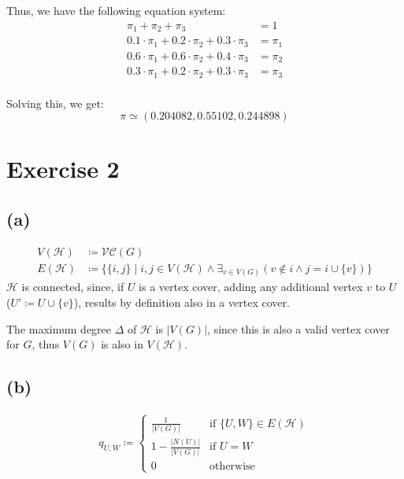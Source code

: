 \documentclass[12pt]{article}
\begin{document}
Thus, we have the following equation system:
\begin{align*}
	\pi_1 + \pi_2 + \pi_3 &= 1 \\
	0.1 \cdot \pi_1 + 0.2 \cdot \pi_2 + 0.3 \cdot \pi_3 &= \pi_1 \\
	0.6 \cdot \pi_1 + 0.6 \cdot \pi_2 + 0.4 \cdot \pi_3 &= \pi_2 \\
	0.3 \cdot \pi_1 + 0.2 \cdot \pi_2 + 0.3 \cdot \pi_3 &= \pi_3 \\
\end{align*}

Solving this, we get:
\begin{equation*}
	\pi \simeq \left(0.204082, 0.55102, 0.244898 \right)
\end{equation*}

\section*{Exercise 2}
\subsection*{(a)}
\begin{align*}
	V(\mathcal{H}) &\coloneqq \mathcal{VC}(G) \\
	E(\mathcal{H}) &\coloneqq \{\{i,j\} \mid i,j \in V(\mathcal{H}) \land \exists_{v \in V(G)} (v \not\in i \land j = i \cup \{v\})\}
\end{align*}
$\mathcal{H}$ is connected, since, if $U$ is a vertex cover, adding any additional vertex $v$ to $U$ ($U' \coloneqq U \cup \{v\}$), results by definition also in a vertex cover.

The maximum degree $\Delta$ of $\mathcal{H}$ is $\vert V(G) \vert$, since this is also a valid vertex cover for $G$, thus $V(G)$ is also in $V(\mathcal{H})$.

\subsection*{(b)}
\begin{align*}
	q_{U,W} \coloneqq
	\begin{cases}
		\frac{1}{\vert V(G) \vert} & \text{if } \{U,W\} \in E({\mathcal{H}}) \\
		1 - \frac{\vert N(U) \vert}{\vert V(G) \vert} & \text{if } U=W \\
		0 & \text{otherwise}
	\end{cases}
\end{align*}
\end{document}
